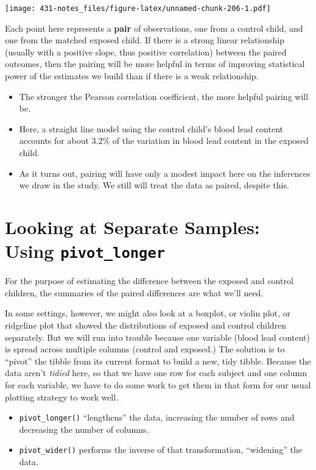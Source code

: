 \documentclass[
]{book}
\providecommand{\tightlist}{%
  \setlength{\itemsep}{0pt}\setlength{\parskip}{0pt}}
\begin{document}
\texttt{[image: 431-notes\_files/figure-latex/unnamed-chunk-206-1.pdf]}

Each point here represents a \textbf{pair} of observations, one from a control child, and one from the matched exposed child. If there is a strong linear relationship (usually with a positive slope, thus positive correlation) between the paired outcomes, then the pairing will be more helpful in terms of improving statistical power of the estimates we build than if there is a weak relationship.

\begin{itemize}
\tightlist
\item
  The stronger the Pearson correlation coefficient, the more helpful pairing will be.
\item
  Here, a straight line model using the control child's blood lead content accounts for about 3.2\% of the variation in blood lead content in the exposed child.
\item
  As it turns out, pairing will have only a modest impact here on the inferences we draw in the study. We still will treat the data as paired, despite this.
\end{itemize}

\hypertarget{looking-at-separate-samples-using-pivot_longer}{%
\section{\texorpdfstring{Looking at Separate Samples: Using \texttt{pivot\_longer}}{Looking at Separate Samples: Using pivot\_longer}}\label{looking-at-separate-samples-using-pivot_longer}}

For the purpose of estimating the difference between the exposed and control children, the summaries of the paired differences are what we'll need.

In some settings, however, we might also look at a boxplot, or violin plot, or ridgeline plot that showed the distributions of exposed and control children separately. But we will run into trouble because one variable (blood lead content) is spread across multiple columns (control and exposed.) The solution is to ``pivot'' the tibble from its current format to build a new, tidy tibble. Because the data aren't \emph{tidied} here, so that we have one row for each subject and one column for each variable, we have to do some work to get them in that form for our usual plotting strategy to work well.

\begin{itemize}
\tightlist
\item
  \texttt{pivot\_longer()} ``lengthens'' the data, increasing the number of rows and decreasing the number of columns.
\item
  \texttt{pivot\_wider()} performs the inverse of that transformation, ``widening'' the data.
\end{itemize}
\end{document}
